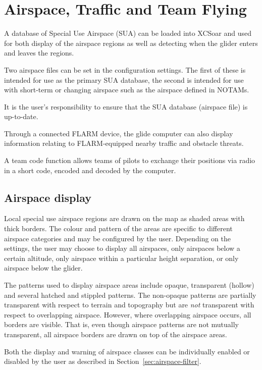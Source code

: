\chapter{Airspace, Traffic and Team Flying}\label{cha:airspace}
A database of Special Use Airspace (SUA) can be loaded into XCSoar and
used for both display of the airspace regions as well as detecting
when the glider enters and leaves the regions.

Two airspace files can be set in the configuration settings.  The
first of these is intended for use as the primary SUA database, the
second is intended for use with short-term or changing airspace such
as the airspace defined in NOTAMs.

It is the user's responsibility to ensure that the SUA database
(air\-space file) is up-to-date.

Through a connected FLARM device, the glide computer can also
display information relating to FLARM-equipped nearby traffic
and obstacle threats.

A team code function allows teams of pilots to exchange their
positions via radio in a short code, encoded and decoded by the
computer.


\section{Airspace display}

Local special use airspace regions are drawn on the map as shaded
areas with thick borders.  The colour and pattern of the areas are
specific to different airspace categories and may be configured by the
user.  Depending on the settings, the user may choose to display all
airspaces, only airspaces below a certain altitude, only airspace within a
particular height separation, or only airspace below the glider.

The patterns used to display airspace areas include opaque,
transparent (hollow) and several hatched and stippled patterns.  The
non-opaque patterns are partially transparent with respect to terrain
and topography but are {\em not} transparent with respect to overlapping
airspace.  However, where overlapping airspace occurs, all borders are
visible.  That is, even though airspace patterns are not mutually
transparent, all airspace borders are drawn on top of the airspace
areas.

Both the display and warning of airspace classes can be individually
enabled or disabled by the user as described in
Section~\ref{sec:airspace-filter}.

